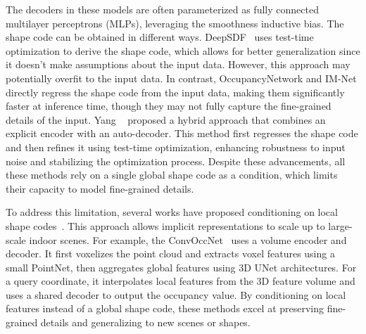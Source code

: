 The decoders in these models are often parameterized as fully connected multilayer perceptrons (MLPs), leveraging the smoothness inductive bias. The shape code can be obtained in different ways. DeepSDF~\cite{park2019deepsdf} uses test-time optimization to derive the shape code, which allows for better generalization since it doesn't make assumptions about the input data. However, this approach may potentially overfit to the input data. In contrast, OccupancyNetwork and IM-Net directly regress the shape code from the input data, making them significantly faster at inference time, though they may not fully capture the fine-grained details of the input. Yang \etal~\cite{yang2023reconstructing} proposed a hybrid approach that combines an explicit encoder with an auto-decoder. This method first regresses the shape code and then refines it using test-time optimization, enhancing robustness to input noise and stabilizing the optimization process. Despite these advancements, all these methods rely on a single global shape code as a condition, which limits their capacity to model fine-grained details.

To address this limitation, several works have proposed conditioning on local shape codes~\cite{peng2020convolutional, jiang2020local, genova2020local, chabra2020deep}. This approach allows implicit representations to scale up to large-scale indoor scenes. For example, the ConvOccNet~\cite{peng2020convolutional} uses a volume encoder and decoder. It first voxelizes the point cloud and extracts voxel features using a small PointNet, then aggregates global features using 3D UNet architectures. For a query coordinate, it interpolates local features from the 3D feature volume and uses a shared decoder to output the occupancy value. By conditioning on local features instead of a global shape code, these methods excel at preserving fine-grained details and generalizing to new scenes or shapes.


